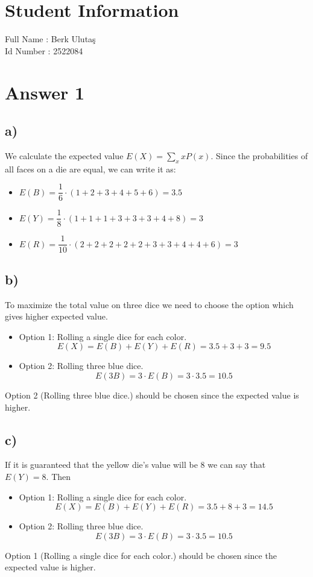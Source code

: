 \documentclass[12pt]{article}
\begin{document}
\section*{Student Information } 
Full Name : Berk Ulutaş \\
Id Number : 2522084 \\

\section*{Answer 1}

\subsection*{a)}
We calculate the expected value $E(X) = \sum\limits_{x} xP(x)$. Since the probabilities of all faces on a die are equal, we can write it as:
\begin{itemize}
    \item $E(B) = \dfrac{1}{6} \cdot (1+2+3+4+5+6) = 3.5 $ 
    \item $E(Y) = \dfrac{1}{8} \cdot (1+1+1+3+3+3+4+8) = 3 $ 
    \item $E(R) = \dfrac{1}{10} \cdot (2+2+2+2+2+3+3+4+4+6) = 3 $
\end{itemize}
\subsection*{b)}

To maximize the total value on three dice we need to choose the option which gives higher expected value.
\begin{itemize}
    \item Option 1: Rolling a single dice for each color.  $$E(X)= E(B)+E(Y)+E(R) = 3.5+3+3 =9.5$$
    \item Option 2: Rolling three blue dice.
    $$E(3B)= 3\cdot E(B) = 3 \cdot 3.5=10.5$$
\end{itemize}
Option 2 (Rolling three blue dice.) should be chosen since the expected value is higher. 
\subsection*{c)} 
If it is guaranteed that the yellow die's value will be 8 we can say that $E(Y) = 8$. Then
\begin{itemize}
    \item Option 1: Rolling a single dice for each color.  $$E(X)= E(B)+E(Y)+E(R) = 3.5+8+3 =14.5$$
    \item Option 2: Rolling three blue dice.
    $$E(3B)= 3\cdot E(B) = 3 \cdot 3.5=10.5$$
\end{itemize}
Option 1 (Rolling a single dice for each color.) should be chosen since the expected value is higher. 
\end{document}
